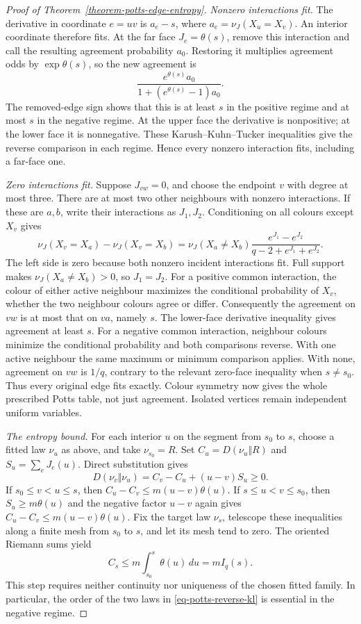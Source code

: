 \documentclass[a4paper,11pt,reqno]{amsart}
\theoremstyle{plain}
\theoremstyle{definition}
\theoremstyle{remark}
\begin{document}
\begin{proof}[Proof of Theorem~\ref{theorem-potts-edge-entropy}]
\smallskip\noindent\emph{Nonzero interactions fit.}
The derivative in coordinate $e=uv$ is $a_e-s$, where
$a_e=\nu_J(X_u=X_v)$.  An interior coordinate therefore fits.
At the far face $J_e=\theta(s)$, remove this interaction and call the
resulting agreement probability $a_0$.  Restoring it multiplies agreement
odds by $\exp\theta(s)$, so the new agreement is
\[
 \frac{e^{\theta(s)}a_0}{1+(e^{\theta(s)}-1)a_0}.
\]
The removed-edge sign shows that this is at least $s$ in the positive
regime and at most $s$ in the negative regime.  At the upper face the
derivative is nonpositive; at the lower face it is nonnegative.  These
Karush--Kuhn--Tucker inequalities give the reverse comparison in each
regime.  Hence every nonzero interaction fits, including a far-face one.

\smallskip\noindent\emph{Zero interactions fit.}
Suppose $J_{vw}=0$, and choose the endpoint $v$ with degree at most three.
There are at most two other neighbours with nonzero interactions.  If these
are $a,b$, write their interactions as $J_1,J_2$.  Conditioning on all
colours except $X_v$ gives
\[
 \nu_J(X_v=X_a)-\nu_J(X_v=X_b)
 =\nu_J(X_a\ne X_b)
       \frac{e^{J_1}-e^{J_2}}{q-2+e^{J_1}+e^{J_2}}.
\]
The left side is zero because both nonzero incident interactions fit.
Full support makes $\nu_J(X_a\ne X_b)>0$, so $J_1=J_2$.
For a positive common interaction, the colour of either active neighbour
maximizes the conditional probability of $X_v$, whether the two neighbour
colours agree or differ.  Consequently the agreement on $vw$ is at most
that on $va$, namely $s$.  The lower-face derivative inequality gives
agreement at least $s$.  For a negative common interaction, neighbour
colours minimize the conditional probability and both comparisons reverse.
With one active neighbour the same maximum or minimum comparison applies.
With none, agreement on $vw$ is $1/q$, contrary to the relevant zero-face
inequality when $s\ne s_0$.  Thus every original edge fits exactly.  Colour
symmetry now gives the whole prescribed Potts table, not just agreement.
Isolated vertices remain independent uniform variables.

\smallskip\noindent\emph{The entropy bound.}
For each interior $u$ on the segment from $s_0$ to $s$, choose a fitted law
$\nu_u$ as above, and take $\nu_{s_0}=R$.  Set
$C_u=D(\nu_u\Vert R)$ and $S_u=\sum_eJ_e(u)$.  Direct substitution gives
\begin{equation}\label{eq-potts-reverse-kl}
 D(\nu_v\Vert\nu_u)=C_v-C_u+(u-v)S_u\ge0.
\end{equation}
If $s_0\le v<u\le s$, then
$C_u-C_v\le m(u-v)\theta(u)$.
If $s\le u<v\le s_0$, then $S_u\ge m\theta(u)$ and the negative factor
$u-v$ again gives $C_u-C_v\le m(u-v)\theta(u)$.
Fix the target law $\nu_s$, telescope these inequalities along a finite
mesh from $s_0$ to $s$, and let its mesh tend to zero.  The oriented
Riemann sums yield
\[
 C_s\le m\int_{s_0}^{s}\theta(u)\,du=mI_q(s).
\]
This step requires neither continuity nor uniqueness of the chosen fitted
family.  In particular, the order of the two laws in
\eqref{eq-potts-reverse-kl} is essential in the negative regime.


\end{proof}
\end{document}
